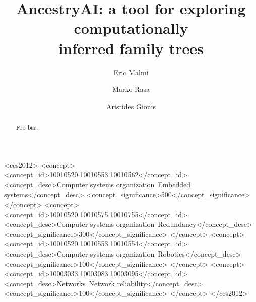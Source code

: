 \documentclass[sigconf]{acmart}
\begin{document}
\title{AncestryAI: a tool for exploring computationally \\ inferred family 
trees}


\author{Eric Malmi}

\author{Marko Rasa}

\author{Aristides Gionis}



\begin{abstract}
Foo bar.
\end{abstract}

\iffalse
%
%
\begin{CCSXML}
<ccs2012>
 <concept>
  <concept_id>10010520.10010553.10010562</concept_id>
  <concept_desc>Computer systems organization~Embedded systems</concept_desc>
  <concept_significance>500</concept_significance>
 </concept>
 <concept>
  <concept_id>10010520.10010575.10010755</concept_id>
  <concept_desc>Computer systems organization~Redundancy</concept_desc>
  <concept_significance>300</concept_significance>
 </concept>
 <concept>
  <concept_id>10010520.10010553.10010554</concept_id>
  <concept_desc>Computer systems organization~Robotics</concept_desc>
  <concept_significance>100</concept_significance>
 </concept>
 <concept>
  <concept_id>10003033.10003083.10003095</concept_id>
  <concept_desc>Networks~Network reliability</concept_desc>
  <concept_significance>100</concept_significance>
 </concept>
</ccs2012>  
\end{CCSXML}
\end{document}
